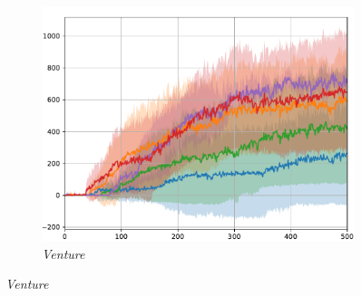 \documentclass[10pt,mathserif]{beamer}
\begin{document}
\begin{frame}
\begin{figure}[ht!]
{\begin{subfigure}{0.32\textwidth}
        \includegraphics[width=\textwidth]{emi_figures/Venture_all.pdf}
        \caption{\textit{Venture}}
    \end{subfigure}
  }
    

\end{figure}
\end{frame}
\end{document}
